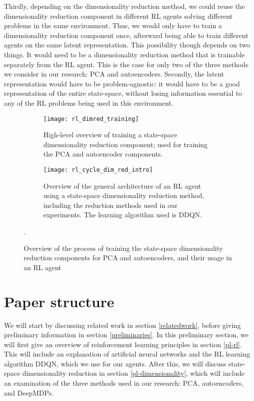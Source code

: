 Thirdly, depending on the dimensionality reduction method, we could reuse the dimensionality reduction component in different RL agents solving different problems in the same environment. Thus, we would only have to train a dimensionality reduction component once, afterward being able to train different agents on the same latent representation. This possibility though depends on two things. It would need to be a dimensionality reduction method that is trainable separately from the RL agent. This is the case for only two of the three methods we consider in our research: PCA and autoencoders. Secondly, the latent representation would have to be problem-agnostic: it would have to be a good representation of the entire state-space, without losing information essential to any of the RL problems being used in this environment.


\begin{figure}[h]
	\centering
	\begin{subfigure}[b]{0.20 \textwidth}
		\texttt{[image: rl\_dimred\_training]}
		\caption{High-level overview of training a state-space dimensionality reduction component; used for training the PCA and autoencoder components.}
		\label{fig:rl_training}
	\end{subfigure}\hfill
	\begin{subfigure}[b]{0.50\textwidth}
		\texttt{[image: rl\_cycle\_dim\_red\_intro]}
    		\caption{Overview of the general architecture of an RL agent using a state-space dimensionality reduction method, including the reduction methods used in our experiments. The learning algorithm used is DDQN.}
    		\label{fig:rl_cycle_dimred}
	\end{subfigure}
	\caption{Overview of the process of training the state-space dimensionality reduction components for PCA and autoencoders, and their usage in an RL agent}.
\end{figure}
	

\section{Paper structure}
We will start by discussing related work in section \ref{relatedwork}, before giving preliminary information in section \ref{preliminaries}. In this preliminary section, we will first give an overview of reinforcement learning principles in section \ref{pl-rl}. This will include an explanation of artificial neural networks and the RL learning algorithm DDQN, which we use for our agents. After this, we will discuss state-space dimensionality reduction in section \ref{pl-dimensionality}, which will include an examination of the three methods used in our research: PCA, autoencoders, and DeepMDPs.

